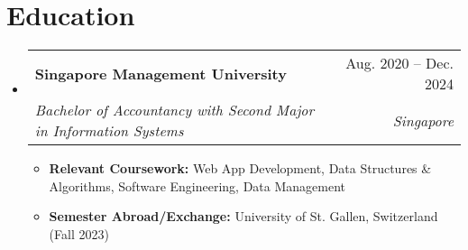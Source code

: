 \documentclass[letterpaper,11pt]{article}
\makeatletter
\newcommand{\resumeItem}[1]{
  \item\small{
    {#1 \vspace{-2pt}}
  }
}
\newcommand{\resumeSubheading}[4]{
  \vspace{-2pt}\item
    \begin{tabular*}{0.97\textwidth}[t]{l@{\extracolsep{\fill}}r}
      \textbf{#1} & #2 \\
      \textit{\small#3} & \textit{\small #4} \\
    \end{tabular*}\vspace{-7pt}
}
\newcommand{\resumeSubHeadingListStart}{\begin{itemize}[leftmargin=0.15in, label={}]}
\newcommand{\resumeSubHeadingListEnd}{\end{itemize}}
\newcommand{\resumeItemListStart}{\begin{itemize}}
\newcommand{\resumeItemListEnd}{\end{itemize}\vspace{-5pt}}
\makeatother
\begin{document}
\section{Education}
  \resumeSubHeadingListStart
    \resumeSubheading
      {Singapore Management University}{Aug. 2020 -- Dec. 2024}
      {Bachelor of Accountancy with Second Major in Information Systems}{Singapore}
      \resumeItemListStart
        \resumeItem{\textbf {Relevant Coursework:} Web App Development, Data Structures \& Algorithms, Software Engineering, Data Management}
        \resumeItem{\textbf {Semester Abroad/Exchange:} University of St. Gallen, Switzerland (Fall 2023)}
      \resumeItemListEnd
  \resumeSubHeadingListEnd


\end{document}

